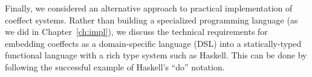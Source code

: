 Finally, we considered an alternative approach to practical implementation of coeffect systems.
Rather than building a specialized programming language (as we did in Chapter~\ref{ch:impl}), we
discuss the technical requirements for embedding coeffects as a domain-specific language (DSL) into
a statically-typed functional language with a rich type system such as Haskell. This can be done by
following the successful example of Haskell's ``do'' notation.
